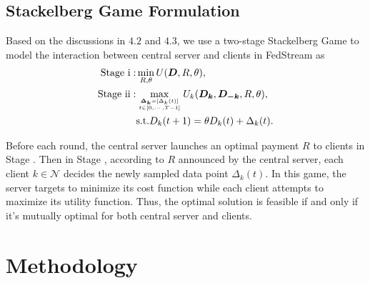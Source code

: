 \documentclass{article}
\theoremstyle{plain}
\theoremstyle{definition}
\theoremstyle{remark}
\begin{document}
\subsection{Stackelberg Game Formulation}
Based on the discussions in $4.2$ and $4.3$, we use a two-stage Stackelberg Game to model the interaction between central server and clients in FedStream as
\begin{equation}
  \begin{aligned}
    \mathrm{Stage\ \uppercase\expandafter{\romannumeral1}:} & 
    \min_{R, \theta}  U(\boldsymbol{D}, R, \theta), \\
    \mathrm{Stage\ \uppercase\expandafter{\romannumeral2}:} &
    \max_{\boldsymbol{\Delta_k}=[\Delta_k(t)] \atop t \in [0,\cdots,T-1]} U_k(\boldsymbol{D_k}, \boldsymbol{D_{-k}}, R, \theta), \\
    & \text{s.t.} D_k(t + 1) = \theta D_k(t) + \Delta_k(t).
  \end{aligned}  
\end{equation}

Before each round, the central server launches an optimal payment $R$ to clients in Stage \uppercase\expandafter{}.
Then in Stage \uppercase\expandafter{}, according to $R$ announced by the central server, each client $k \in \mathcal{N}$ decides the newly sampled data point $\Delta_k(t)$.
In this game, the server targets to minimize its cost function while each client attempts to maximize its utility function.
Thus, the optimal solution is feasible if and only if it's mutually optimal for both central server and clients.

\section{Methodology}
\end{document}
